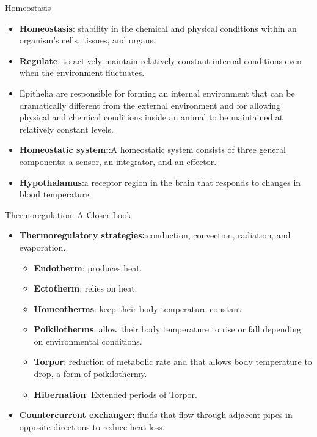 \documentclass[12pt,letterpaper]{article}
\begin{document}
\hypertarget{39.4}{}
\begin{secbox}{\hyperlink{39}{Homeostasis}}{
    \begin{itemize}
        \item \textbf{Homeostasis}: stability in the chemical and physical conditions within an organism’s cells, tissues, and organs.
        \item \textbf{Regulate}: to actively maintain relatively constant internal conditions even when the environment fluctuates.
        \item Epithelia are responsible for forming an internal environment that can be dramatically different from the external environment and for allowing physical and chemical conditions inside an animal to be maintained at relatively constant levels.
        \item \textbf{Homeostatic system:}:A homeostatic system consists of three general components: a sensor, an integrator, and an effector.
        \item \textbf{Hypothalamus}:a receptor region in the brain that responds to changes in blood temperature.
    \end{itemize}
}\end{secbox}

\hypertarget{39.5}{}
\begin{secbox}{\hyperlink{39}{Thermoregulation: A Closer Look}}{
    \begin{itemize}
        \item \textbf{Thermoregulatory strategies:}:conduction, convection, radiation, and evaporation.
        \begin{itemize}
            \item \textbf{Endotherm}: produces heat.
            \item \textbf{Ectotherm}: relies on heat.
            \item \textbf{Homeotherms}: keep their body temperature constant
            \item \textbf{Poikilotherms}: allow their body temperature to rise or fall depending on environmental conditions.
            \item \textbf{Torpor}: reduction of metabolic rate and that allows body temperature to drop, a form of poikilothermy.
            \item \textbf{Hibernation}: Extended periods of Torpor. 
        \end{itemize}
        \item \textbf{Countercurrent exchanger}: fluids that flow through adjacent pipes in opposite directions to reduce heat loss.
    \end{itemize}
}\end{secbox}   
\end{document}
